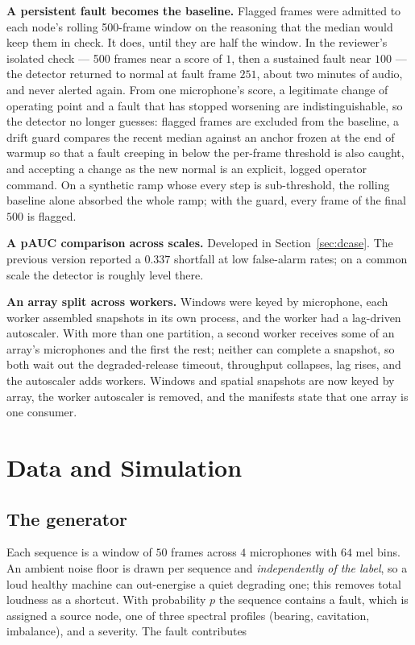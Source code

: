 \documentclass[11pt]{article}
\let\oldsection\section
\renewcommand{\section}{\clearpage\oldsection}
\begin{document}
\textbf{A persistent fault becomes the baseline.} Flagged frames were admitted
to each node's rolling 500-frame window on the reasoning that the median would
keep them in check. It does, until they are half the window. In the reviewer's
isolated check --- 500 frames near a score of $1$, then a sustained fault near
$100$ --- the detector returned to normal at fault frame $251$, about two
minutes of audio, and never alerted again. From one microphone's score, a
legitimate change of operating point and a fault that has stopped worsening are
indistinguishable, so the detector no longer guesses: flagged frames are
excluded from the baseline, a drift guard compares the recent median against an
anchor frozen at the end of warmup so that a fault creeping in below the
per-frame threshold is also caught, and accepting a change as the new normal is
an explicit, logged operator command. On a synthetic ramp whose every step is
sub-threshold, the rolling baseline alone absorbed the whole ramp; with the
guard, every frame of the final $500$ is flagged.

\textbf{A pAUC comparison across scales.} Developed in
Section~\ref{sec:dcase}. The previous version reported a $0.337$ shortfall at
low false-alarm rates; on a common scale the detector is roughly level there.

\textbf{An array split across workers.} Windows were keyed by microphone, each
worker assembled snapshots in its own process, and the worker had a lag-driven
autoscaler. With more than one partition, a second worker receives some of an
array's microphones and the first the rest; neither can complete a snapshot, so
both wait out the degraded-release timeout, throughput collapses, lag rises, and
the autoscaler adds workers. Windows and spatial snapshots are now keyed by
array, the worker autoscaler is removed, and the manifests state that one array
is one consumer.

\section{Data and Simulation}
\label{sec:data}

\subsection{The generator}

Each sequence is a window of $50$ frames across $4$ microphones with $64$ mel
bins. An ambient noise floor is drawn per sequence and \emph{independently of
the label}, so a loud healthy machine can out-energise a quiet degrading one;
this removes total loudness as a shortcut. With probability $p$ the sequence
contains a fault, which is assigned a source node, one of three spectral
profiles (bearing, cavitation, imbalance), and a severity. The fault contributes
\end{document}
